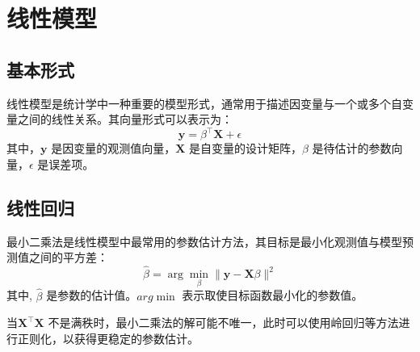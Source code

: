 \chapter{线性模型}
\section{基本形式}
线性模型是统计学中一种重要的模型形式，通常用于描述因变量与一个或多个自变量之间的线性关系。其向量形式可以表示为：
\begin{equation}
\mathbf{y} = \beta^\top \mathbf{X} + \epsilon
\end{equation}
其中，$\mathbf{y}$ 是因变量的观测值向量，$\mathbf{X}$ 是自变量的设计矩阵，$\beta$ 是待估计的参数向量，$\epsilon$ 是误差项。
\section{线性回归}
最小二乘法是线性模型中最常用的参数估计方法，其目标是最小化观测值与模型预测值之间的平方差：
\begin{equation}
\hat{\beta} = \arg\min_{\beta} \|\mathbf{y} - \mathbf{X} \beta\|^2
\end{equation}
其中, $\hat{\beta}$ 是参数的估计值。$arg\min$ 表示取使目标函数最小化的参数值。

当$\mathbf{X}^\top \mathbf{X}$ 不是满秩时，最小二乘法的解可能不唯一，此时可以使用岭回归等方法进行正则化，以获得更稳定的参数估计。

